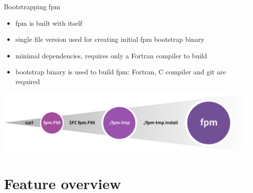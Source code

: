 \documentclass[lualatex,10pt,aspectratio=169]{beamer}
\begin{document}
\begin{frame}{Bootstrapping fpm}
   \begin{itemize}
      \item fpm is built with itself
      \item single file version used for creating initial fpm bootstrap binary
      \item minimal dependencies, requires only a Fortran compiler to build
      \item bootstrap binary is used to build fpm: Fortran, C compiler and git are required
   \end{itemize}
   \vfill

   \centering
   \includegraphics[width=.9\textwidth]{Figures/bootstrapping.pdf}
\end{frame}


\section{Feature overview}
\end{document}
